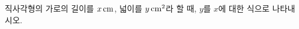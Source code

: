 \hspace*{2mm}\begin{minipage}[t]{\dimexpr\linewidth-2mm\relax}\vspace{0pt}
직사각형의 가로의 길이를 $x\mkern3mu \mathrm{cm}$, 넓이를 $y\mkern3mu \mathrm{cm}^2$라 할 때, $y$를 $x$에 대한 식으로 나타내시오.\end{minipage}
